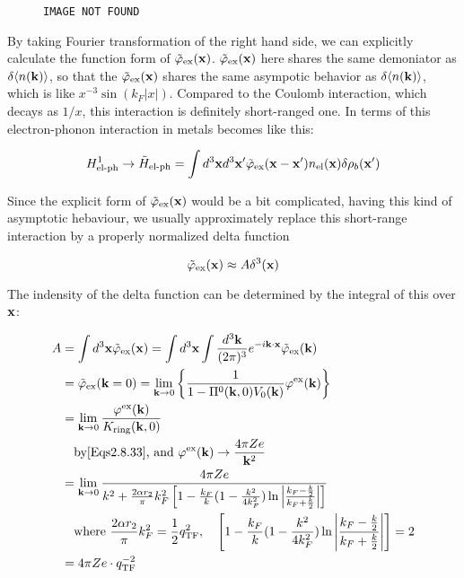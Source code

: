 \begin{wrapfigure}{l}{4cm}
\texttt{\large IMAGE NOT FOUND}
\end{wrapfigure}
By taking Fourier transformation of the right hand side, we can explicitly calculate the function form of $\tilde\varphi_{\text{ex}}({\bf x})$. $\tilde\varphi_{\text{ex}}({\bf x})$ here shares the same demoniator as $\delta\langle n({\bf k})\rangle$, so that the $\tilde\varphi_{\text{ex}}({\bf x})$ shares the same asympotic behavior as $\delta\langle n({\bf k})\rangle$, which is like $x^{-3}\sin(k_F|x|)$. Compared to the Coulomb interaction, which decays as $1/x$, this interaction is definitely short-ranged one. In terms of this electron-phonon interaction in metals becomes like this:

\[H_{\text{el-ph}}^1\to\tilde H_{\text{el-ph}} = \int d^3{\bf x}d^3{\bf x'} \tilde\varphi_{\text{ex}}({\bf x - x'}) n_{\text{el}}({\bf x})\delta\rho_b({\bf x'})\]

Since the explicit form of $\tilde\varphi_{\text{ex}}({\bf x})$ would be a bit complicated, having this kind of asymptotic hebaviour, we usually approximately replace this short-range interaction by a properly normalized delta function

\[\tilde\varphi_{\text{ex}}({\bf x}) \approx A\delta^3({\bf x})\]

The indensity of the delta function can be determined by the integral of this over $\bf x$:

\[\begin{split}
A &=\int d^3{\bf x}\tilde\varphi_{\text{ex}}({\bf x}) = \int d^3{\bf x}\int \frac{d^3\bf k}{(2\pi)^3}e^{-i\bf k\cdot x}\tilde\varphi_{\text{ex}}({\bf k})\\
&=\tilde\varphi_{\text{ex}}({\bf k} = 0) = \lim_{{\bf k}\to0}\left\{\frac{1}{1 - \Pi^0({\bf k},0)V_0({\bf k})}\varphi^{\text{ex}}({\bf k}) \right\}\\
&=\lim_{{\bf k}\to0}\frac{\varphi^{\text{ex}}({\bf k})}{K_{\text{ring}}({\bf k},0)}\\
&\quad \text{by\eqref{Eqs2.8.33}, and }\varphi^{\text{ex}}({\bf k}) \to \frac{4\pi Ze}{{\bf k}^2}\\
&=\lim_{{\bf k}\to0}\frac{4\pi Ze}{k^2+\frac{2\alpha r_2}{\pi}k_F^2\left[1 - \frac{k_F}{k}(1-\frac{k^2}{4k_F^2})\ln\left|\frac{k_F - \frac{k}{2}}{k_F + \frac{k}{2}}\right|\right]}\\
&\quad \text{where }\frac{2\alpha r_2}{\pi}k_F^2 = \frac{1}{2}q_{\text{TF}}^{2},\quad \left[1 - \frac{k_F}{k}(1-\frac{k^2}{4k_F^2})\ln\left|\frac{k_F - \frac{k}{2}}{k_F + \frac{k}{2}}\right|\right] = 2\\
&=4\pi Ze\cdot q_{\text{TF}}^{-2}
\end{split} \]

